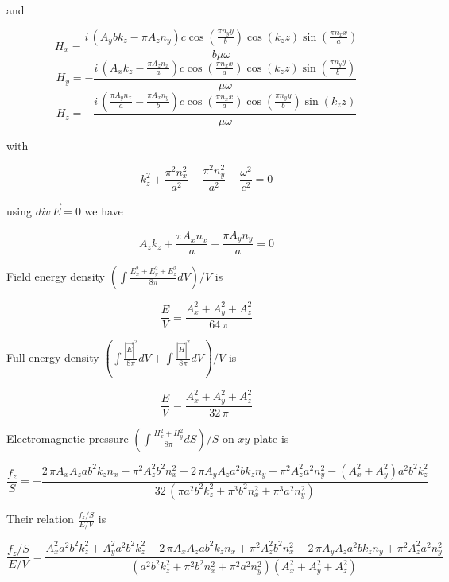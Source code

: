 \documentclass[twoside, 10pt]{article}
\begin{document}
\begin{multicols}{2}
and

\[H_{x} = \frac{i \, {\left(A_{y} b k_{z} - \pi A_{z} n_{y}\right)} c \cos\left(\frac{\pi n_{y} y}{b}\right) \cos\left(k_{z} z\right) \sin\left(\frac{\pi n_{x} x}{a}\right)}{b \mu \omega}\]
\[H_{y} = -\frac{i \, {\left(A_{x} k_{z} - \frac{\pi A_{z} n_{x}}{a}\right)} c \cos\left(\frac{\pi n_{x} x}{a}\right) \cos\left(k_{z} z\right) \sin\left(\frac{\pi n_{y} y}{b}\right)}{\mu \omega}\]
\[H_{z} = -\frac{i \, {\left(\frac{\pi A_{y} n_{x}}{a} - \frac{\pi A_{x} n_{y}}{b}\right)} c \cos\left(\frac{\pi n_{x} x}{a}\right) \cos\left(\frac{\pi n_{y} y}{b}\right) \sin\left(k_{z} z\right)}{\mu \omega}\]

with

\[k_{z}^{2} + \frac{\pi^{2} n_{x}^{2}}{a^{2}} + \frac{\pi^{2} n_{y}^{2}}{a^{2}} - \frac{\omega^{2}}{c^{2}} = 0\]

using \(div\,\vec{E} = 0\) we have

\[A_{z} k_{z} + \frac{\pi A_{x} n_{x}}{a} + \frac{\pi A_{y} n_{y}}{a} = 0\]

Field energy density
\(\left(\int \frac{E_x^2+E_y^2+E_z^2}{8 \pi}dV\right)\big/{V}\) is

\[\frac{E}{V} = \frac{{A_{x}^{2} + A_{y}^{2} + A_{z}^{2}} }{64 \, \pi}\]

    Full energy density
\(\left(\int \frac{|\vec{E}|^2}{8 \pi}dV + \int \frac{|\vec{H}|^2}{8 \pi}dV\right)\big/{V}\)
is

    \[\frac{E}{V} = \frac{{A_{x}^{2} + A_{y}^{2} + A_{z}^{2}}}{32 \, \pi}\]

    Electromagnetic pressure
\(\left({\int \frac {H_x^2+H_y^2}{8 \pi} dS}\right)\big/{S}\) on \(xy\)
plate is

\end{multicols}

    \[\frac{f_z}{S} = -\frac{2 \, \pi A_{x} A_{z} a b^{2} k_{z} n_{x} - \pi^{2} A_{z}^{2} b^{2} n_{x}^{2} + 2 \, \pi A_{y} A_{z} a^{2} b k_{z} n_{y} - \pi^{2} A_{z}^{2} a^{2} n_{y}^{2} - {\left(A_{x}^{2} + A_{y}^{2}\right)} a^{2} b^{2} k_{z}^{2}}{32 \, {\left(\pi a^{2} b^{2} k_{z}^{2} + \pi^{3} b^{2} n_{x}^{2} + \pi^{3} a^{2} n_{y}^{2}\right)}}\]

    Their relation \(\frac{f_z/S}{E/V}\) is

    \[\frac{f_z/S}{E/V} = \frac{A_{x}^{2} a^{2} b^{2} k_{z}^{2} + A_{y}^{2} a^{2} b^{2} k_{z}^{2} - 2 \, \pi A_{x} A_{z} a b^{2} k_{z} n_{x} + \pi^{2} A_{z}^{2} b^{2} n_{x}^{2} - 2 \, \pi A_{y} A_{z} a^{2} b k_{z} n_{y} + \pi^{2} A_{z}^{2} a^{2} n_{y}^{2}}{{\left(a^{2} b^{2} k_{z}^{2} + \pi^{2} b^{2} n_{x}^{2} + \pi^{2} a^{2} n_{y}^{2}\right)} {\left(A_{x}^{2} + A_{y}^{2} + A_{z}^{2}\right)}}\]
\end{document}
